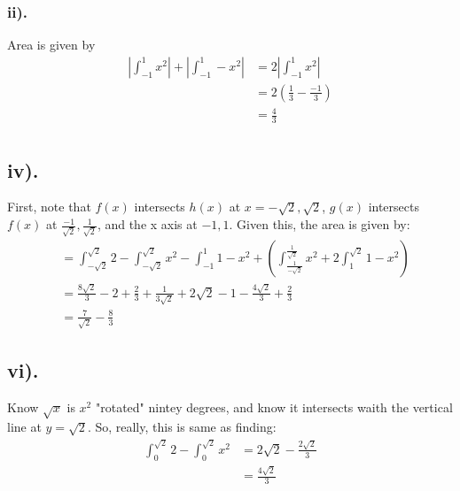 \documentclass{article}
\begin{document}
\subsubsection*{ii).}
Area is given by 
\begin{align*}
|\int_{-1}^{1} x^{2}| + |\int_{-1}^{1} -x^{2}| &= 2|\int_{-1}^{1} x^{2}|\\
&=2\left(\frac{1}{3}-\frac{-1}{3}\right)\\
&=\frac{4}{3}\\
\end{align*}
\subsection*{iv).}
First, note that $f(x)$ intersects $h(x)$ at $x=-\sqrt{2}, \sqrt{2}$, $g(x)$ intersects $f(x)$ at $\frac{-1}{\sqrt{2}}, \frac{1}{\sqrt{2}}$, and the x axis at $-1, 1$. Given this, the area is given by:
\begin{align*}
&=\int_{-\sqrt{2}}^{\sqrt{2}} 2 - \int_{-\sqrt{2}}^{\sqrt{2}} x^{2} - \int_{-1}^{1} 1 - x^{2} + \left( \int_{\frac{1}{-\sqrt{2}}}^{\frac{1}{\sqrt{2}}} x^{2} + 2\int_{1}^{\sqrt{2}} 1-x^2\right)\\
&=\frac{8\sqrt{2}}{3} - 2 + \frac{2}{3} + \frac{1}{3\sqrt{2}} + 2\sqrt{2} - 1 - \frac{4\sqrt{2}}{3} + \frac{2}{3}\\
&=\frac{7}{\sqrt{2}} - \frac{8}{3}
\end{align*}
\subsection*{vi).}
Know $\sqrt{x}$ is $x^2$ "rotated" nintey degrees, and know it intersects waith the vertical line at $y=\sqrt{2}$. So, really, this is same as finding:
\begin{align*}
\int_{0}^{\sqrt{2}} 2 - \int_{0}^{\sqrt{2}} x^2 &= 2\sqrt{2} - \frac{2\sqrt{2}}{3}\\
&=\frac{4\sqrt{2}}{3}
\end{align*}
\end{document}

